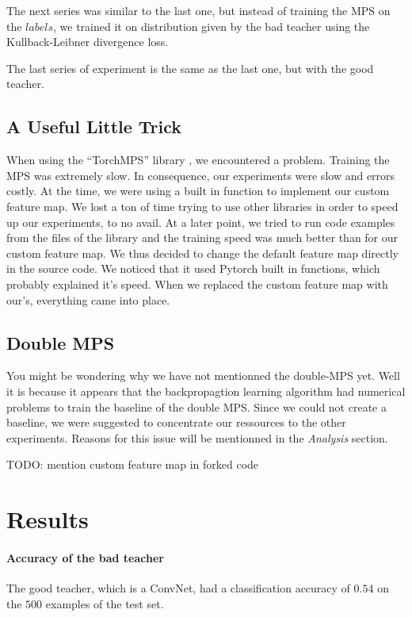 \documentclass{article}
\theoremstyle{definition}
\theoremstyle{definition}
\begin{document}
The next series was similar to the last one, but instead of training the MPS on the $labels$, we trained it on distribution given by the bad teacher using the Kullback-Leibner divergence loss.

The last series of experiment is the same as the last one, but with the good teacher.

\subsection{A Useful Little Trick}
When using the \enquote{TorchMPS} library \cite{torchmps}, we encountered a problem. Training the MPS was extremely slow. In consequence, our experiments were slow and errors costly. At the time, we were using a built in function to implement our custom feature map. We lost a ton of time trying to use other libraries in order to speed up our experiments, to no avail. At a later point, we tried to run code examples from the files of the library and the training speed was much better than for our custom feature map. We thus decided to change the default feature map directly in the source code. We noticed that it used Pytorch built in functions, which probably explained it's speed. When we replaced the custom feature map with our's, everything came into place.


\subsection{Double MPS}
You might be wondering why we have not mentionned the double-MPS yet. Well it is because it appears that the backpropagtion learning algorithm had numerical problems to train the baseline of the double MPS. Since we could not create a baseline, we were suggested to concentrate our ressources to the other experiments. Reasons for this issue will be mentionned in the \emph{Analysis} section. 





TODO: mention custom feature map in forked code


\section{Results}
\paragraph{Accuracy of the bad teacher}
The good teacher, which is a ConvNet, had a classification accuracy of $0.54$ on the $500$ examples of the test set.
\end{document}
